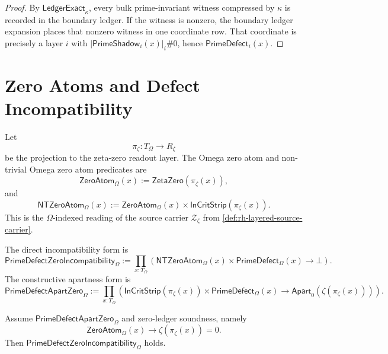 \begin{proof}
By $\mathsf{LedgerExact}_{\kappa}$, every bulk prime-invariant witness
compressed by $\kappa$ is recorded in the boundary ledger. If the witness
is nonzero, the boundary ledger expansion places that nonzero witness in
one coordinate row. That coordinate is precisely a layer $i$ with
$|\mathsf{PrimeShadow}_i(x)|_i\#0$, hence
$\mathsf{PrimeDefect}_i(x)$.
\end{proof}

\section{Zero Atoms and Defect Incompatibility}
\label{sec:rh-zero-atoms-defect-incompatibility}

\begin{definition}
\label{def:rh-omega-zero-atom}
Let
$$
\pi_{\zeta}:T_{\Omega}\to R_{\zeta}
$$
be the projection to the zeta-zero readout layer. The Omega zero atom and
non-trivial Omega zero atom predicates are
$$
\mathsf{ZeroAtom}_{\Omega}(x)
:=
\mathsf{ZetaZero}(\pi_{\zeta}(x)),
$$
and
$$
\mathsf{NTZeroAtom}_{\Omega}(x)
:=
\mathsf{ZeroAtom}_{\Omega}(x)
\times
\mathsf{InCritStrip}(\pi_{\zeta}(x)).
$$
This is the $\Omega$-indexed reading of the source carrier
$\mathcal Z_{\zeta}$ from \autoref{def:rh-layered-source-carrier}.
\end{definition}

\begin{definition}
\label{def:rh-prime-defect-zero-incompatibility-interface}
The direct incompatibility form is
$$
\mathsf{PrimeDefectZeroIncompatibility}_{\Omega}
:=
\prod_{x:T_{\Omega}}
\left(
\mathsf{NTZeroAtom}_{\Omega}(x)
\times
\mathsf{PrimeDefect}_{\Omega}(x)
\to
\bot
\right).
$$
The constructive apartness form is
$$
\mathsf{PrimeDefectApartZero}_{\Omega}
:=
\prod_{x:T_{\Omega}}
\left(
\mathsf{InCritStrip}(\pi_{\zeta}(x))
\times
\mathsf{PrimeDefect}_{\Omega}(x)
\to
\mathsf{Apart}_{0}(\zeta(\pi_{\zeta}(x)))
\right).
$$
\end{definition}

\begin{theorem}
\label{thm:rh-prime-defect-apart-zero-gives-incompatibility}
Assume $\mathsf{PrimeDefectApartZero}_{\Omega}$ and zero-ledger soundness,
namely
$$
\mathsf{ZeroAtom}_{\Omega}(x)
\to
\zeta(\pi_{\zeta}(x))=0.
$$
Then $\mathsf{PrimeDefectZeroIncompatibility}_{\Omega}$ holds.
\end{theorem}

